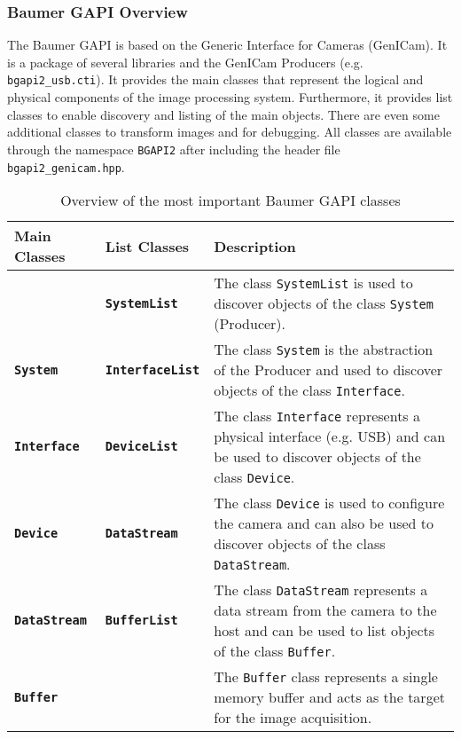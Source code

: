 \subsubsection{Baumer GAPI Overview}
\label{subsubsec:baumer_gapi_overview}

The Baumer GAPI is based on the Generic Interface for Cameras (GenICam).
It is a package of several libraries and the GenICam Producers (e.g. \texttt{bgapi2\_usb.cti}).
It provides the main classes that represent the logical and physical components of the image processing system.
Furthermore, it provides list classes to enable discovery and listing of the main objects.
There are even some additional classes to transform images and for debugging.
All classes are available through the namespace \texttt{BGAPI2} after including the header file \texttt{bgapi2\_genicam.hpp}.

\begin{table}[ht]
  \caption{Overview of the most important Baumer GAPI classes}
  \label{tab:baumer_gapi}
  \centering
  \begin{tabular}{llp{8.5cm}}
    \toprule
    \textbf{Main Classes} & \textbf{List Classes} & \textbf{Description} \\
    \midrule
     & \textbf{\texttt{SystemList}} & The class \texttt{SystemList} is used to discover objects of the class \texttt{System} (Producer). \\
    \midrule
    \textbf{\texttt{System}} & \textbf{\texttt{InterfaceList}} & The class \texttt{System} is the abstraction of the Producer and used to discover objects of the class \texttt{Interface}. \\
    \midrule
    \textbf{\texttt{Interface}} & \textbf{\texttt{DeviceList}} & The class \texttt{Interface} represents a physical interface (e.g. USB) and can be used to discover objects of the class \texttt{Device}. \\
    \midrule
    \textbf{\texttt{Device}} & \textbf{\texttt{DataStream}} & The class \texttt{Device} is used to configure the camera and can also be used to discover objects of the class \texttt{DataStream}. \\
    \midrule
    \textbf{\texttt{DataStream}} & \textbf{\texttt{BufferList}} & The class \texttt{DataStream} represents a data stream from the camera to the host and can be used to list objects of the class \texttt{Buffer}. \\
    \midrule
    \textbf{\texttt{Buffer}} &  & The \texttt{Buffer} class represents a single memory buffer and acts as the target for the image acquisition. \\
    \bottomrule
  \end{tabular}
\end{table}

